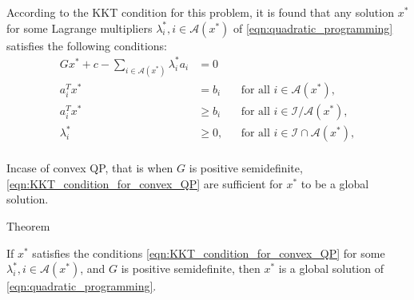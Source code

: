 According to the KKT condition for this problem, it is found that any solution $x^*$ for some Lagrange multipliers $\lambda_i^*, i\in \mathcal{A}(x^*)$ of \ref{eqn:quadratic_programming} satisfies the following conditions:
\begin{equation}
	\begin{aligned}
		Gx^*+c-\sum_{i\in \mathcal{A}(x^*)} \lambda_i^*a_i &= 0\\
		a_i^Tx^* &= b_i & & \text{for all }i\in \mathcal{A}(x^*),\\
		a_i^Tx^* &\geqslant b_i & & \text{for all }i\in \mathcal{I} \slash \mathcal{A}(x^*),\\
		\lambda_i^* &\geqslant 0 , & & \text{for all }i\in \mathcal{I} \cap \mathcal{A}(x^*),\\
	\end{aligned}
	\label{eqn:KKT_condition_for_convex_QP}
\end{equation}

Incase of convex QP, that is when $G$ is positive semidefinite, \ref{eqn:KKT_condition_for_convex_QP} are sufficient for $x^*$ to be a global solution.

\begin{mybox}{Theorem}
\begin{theorem}
	If $x^*$ satisfies the conditions \ref{eqn:KKT_condition_for_convex_QP} for some $\lambda_i^*,i \in \mathcal{A}(x^*)$, and $G$ is positive semidefinite, then $x^*$ is a global solution of \ref{eqn:quadratic_programming}.
\end{theorem}
\end{mybox}

